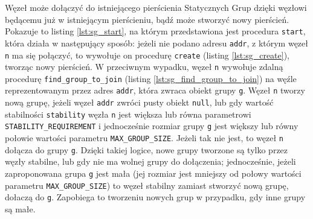 \documentclass[12pt, twoside, openany]{report}
\begin{document}
Węzeł może dołączyć do istniejącego pierścienia Statycznych Grup dzięki węzłowi będącemu już w istniejącym pierścieniu, bądź może stworzyć nowy pierścień. Pokazuje to listing \ref{lst:sg_start}, na którym przedstawiona jest procedura \texttt{start}, która działa w następujący sposób: jeżeli nie podano adresu \texttt{addr}, z którym węzeł \texttt{n} ma się połączyć, to wywołuje on procedurę \texttt{create} (listing \ref{lst:sg_create}), tworząc nowy pierścień. W przeciwnym wypadku, węzeł \texttt{n} wywołuje zdalną procedurę \texttt{find\_group\_to\_join} (listing \ref{lst:sg_find_group_to_join}) na węźle reprezentowanym przez adres \texttt{addr}, która zwraca obiekt grupy \texttt{g}. Węzeł \texttt{n} tworzy nową grupę, jeżeli węzeł \texttt{addr} zwróci pusty obiekt \texttt{null}, lub gdy wartość stabilności \texttt{stability} węzła \texttt{n} jest większa lub równa parametrowi \texttt{STABILITY\_REQUIREMENT} i jednocześnie rozmiar grupy \texttt{g} jest większy lub równy połowie wartości parametru \texttt{MAX\_GROUP\_SIZE}. Jeżeli tak nie jest, to węzeł \texttt{n} dołącza do grupy \texttt{g}. Dzięki takiej logice, nowe grupy tworzone są tylko przez węzły stabilne, lub gdy nie ma wolnej grupy do dołączenia; jednocześnie, jeżeli zaproponowana grupa \texttt{g} jest mała (jej rozmiar jest mniejszy od połowy wartości parametru \texttt{MAX\_GROUP\_SIZE}) to węzeł stabilny zamiast stworzyć nową grupę, dołaczą do \texttt{g}. Zapobiega to tworzeniu nowych grup w przypadku, gdy inne grupy są małe.










\end{document}
